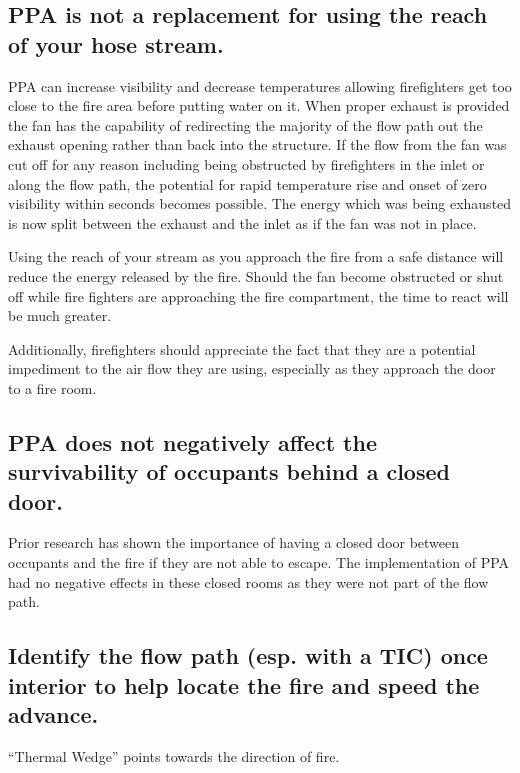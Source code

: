\documentclass{article}
\begin{document}
\subsection{PPA is not a replacement for using the reach of your hose stream.}
PPA can increase visibility and decrease temperatures allowing firefighters get too close to the fire area before putting water on it. When proper exhaust is provided the fan has the capability of redirecting the majority of the flow path out the exhaust opening rather than back into the structure. If the flow from the fan was cut off for any reason including being obstructed by firefighters in the inlet or along the flow path, the potential for rapid temperature rise and onset of zero visibility within seconds becomes possible. The energy which was being exhausted is now split between the exhaust and the inlet as if the fan was not in place. 

Using the reach of your stream as you approach the fire from a safe distance will reduce the energy released by the fire. Should the fan become obstructed or shut off while fire fighters are approaching the fire compartment, the time to react will be much greater. 

Additionally, firefighters should appreciate the fact that they are a potential impediment to the air flow they are using, especially as they approach the door to a fire room. 

\subsection{PPA does not negatively affect the survivability of occupants behind a closed door.}
Prior research has shown the importance of having a closed door between occupants and the fire if they are not able to escape.  The implementation of PPA had no negative effects in these closed rooms as they were not part of the flow path.  

\subsection{Identify the flow path (esp. with a TIC) once interior to help locate the fire and speed the advance.}
“Thermal Wedge” points towards the direction of fire.
\end{document}
